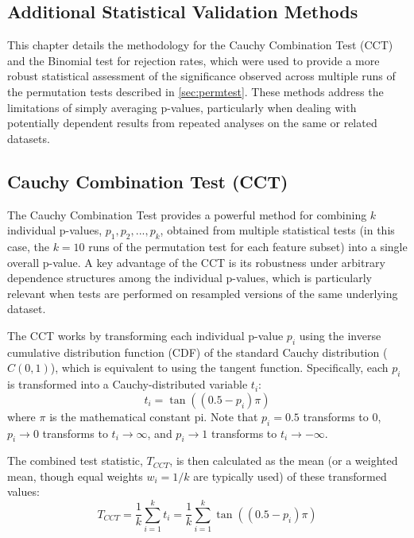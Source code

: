 \begin{appendices}
  \chapter{Additional Statistical Validation Methods}
  \label{app:cct}

  This chapter details the methodology for the Cauchy Combination Test (CCT) and the Binomial test for rejection rates, which were used to provide a more robust statistical assessment of the significance observed across multiple runs of the permutation tests described in \autoref{sec:permtest}. These methods address the limitations of simply averaging p-values, particularly when dealing with potentially dependent results from repeated analyses on the same or related datasets.

  \section{Cauchy Combination Test (CCT)}
  \label{sec:cct_methodology}

  The Cauchy Combination Test \autocite{liu2020cauchy} provides a powerful method for combining $k$ individual p-values, $p_1, p_2, ..., p_k$, obtained from multiple statistical tests (in this case, the $k=10$ runs of the permutation test for each feature subset) into a single overall p-value. A key advantage of the CCT is its robustness under arbitrary dependence structures among the individual p-values, which is particularly relevant when tests are performed on resampled versions of the same underlying dataset.

  The CCT works by transforming each individual p-value $p_i$ using the inverse cumulative distribution function (CDF) of the standard Cauchy distribution ($C(0,1)$), which is equivalent to using the tangent function. Specifically, each $p_i$ is transformed into a Cauchy-distributed variable $t_i$:
  \begin{equation}
    t_i = \tan\left( (0.5 - p_i) \pi \right)
    \label{eq:cct_transform}
  \end{equation}
  where $\pi$ is the mathematical constant pi. Note that $p_i=0.5$ transforms to 0, $p_i \to 0$ transforms to $t_i \to \infty$, and $p_i \to 1$ transforms to $t_i \to -\infty$.

  The combined test statistic, $T_{CCT}$, is then calculated as the mean (or a weighted mean, though equal weights $w_i=1/k$ are typically used) of these transformed values:
  \begin{equation}
    T_{CCT} = \frac{1}{k} \sum_{i=1}^k t_i = \frac{1}{k} \sum_{i=1}^k \tan\left( (0.5 - p_i) \pi \right)
    \label{eq:cct_statistic}
  \end{equation}


\end{appendices}
